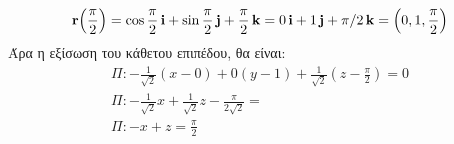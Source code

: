 \documentclass[a4paper,table]{report}
\begin{document}
\begin{solution}
    \[
      \mathbf{r}\Bigl(\frac{\pi}{2}\Bigr)= \cos{\frac{\pi}{2}}\, \mathbf{i} +
      \sin{\frac{\pi}{2}} \,
      \mathbf{j} + \frac{\pi}{2}\, \mathbf{k} =  0\,\mathbf{i} + 1\,\mathbf{j} +
      \pi /2\,\mathbf{k} = \Bigl(0,1, \frac{\pi}{2}\Bigr)
    \] 
    Άρα η εξίσωση του κάθετου επιπέδου, θα είναι:
    \begin{gather*}
      \Pi: - \frac{1}{\sqrt{2}} (x- 0)  + 0(y-1) + \frac{1}{\sqrt{2}} (z-
      \frac{\pi}{2}) = 0 \\ 
      \Pi: - \frac{1}{\sqrt{2}} x + \frac{1}{\sqrt{2}} z - \frac{\pi}{2
      \sqrt{2}} = \\ 
      \Pi: - x + z = \frac{\pi}{2}
    \end{gather*}  




  \end{solution}
\end{document}
